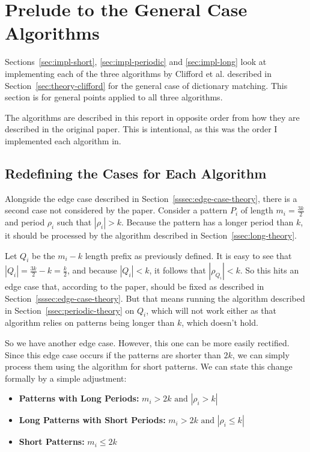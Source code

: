 \documentclass[ %
                    author={Dominic Joseph Moylett},
                    degree={MEng},
                     title={Dictionary Matching with Fingerprints},
                  subtitle={An Empirical Analysis},
                      type={research},
                      year={2015} ]{dissertation}
\begin{document}
\section{Prelude to the General Case Algorithms}

Sections~\ref{sec:impl-short}, \ref{sec:impl-periodic} and \ref{sec:impl-long} look at implementing each of the three algorithms by Clifford et al. described in Section~\ref{sec:theory-clifford} for the general case of dictionary matching. This section is for general points applied to all three algorithms.

The algorithms are described in this report in opposite order from how they are described in the original paper. This is intentional, as this was the order I implemented each algorithm in.

\subsection{Redefining the Cases for Each Algorithm}
\label{ssec:case-redefine}

Alongside the edge case described in Section~\ref{sssec:edge-case-theory}, there is a second case not considered by the paper. Consider a pattern $P_i$ of length $m_i = \frac{3k}{2}$ and period $\rho_i$ such that $|\rho_i| > k$. Because the pattern has a longer period than $k$, it should be processed by the algorithm described in Section~\ref{ssec:long-theory}.

Let $Q_i$ be the $m_i - k$ length prefix as previously defined. It is easy to see that $|Q_i| = \frac{3k}{2} - k = \frac{k}{2}$, and because $|Q_i| < k$, it follows that $|\rho_{Q_i}| < k$. So this hits an edge case that, according to the paper, should be fixed as described in Section~\ref{sssec:edge-case-theory}. But that means running the algorithm described in Section~\ref{ssec:periodic-theory} on $Q_i$, which will not work either as that algorithm relies on patterns being longer than $k$, which doesn't hold.

So we have another edge case. However, this one can be more easily rectified. Since this edge case occurs if the patterns are shorter than $2k$, we can simply process them using the algorithm for short patterns. We can state this change formally by a simple adjustment:

\begin{itemize}
  \item \textbf{Patterns with Long Periods:} $m_i > 2k \text{ and } |\rho_i > k|$
  \item \textbf{Long Patterns with Short Periods:} $m_i > 2k \text{ and } |\rho_i \leq k|$
  \item \textbf{Short Patterns:} $m_i \leq 2k$
\end{itemize}
\end{document}
